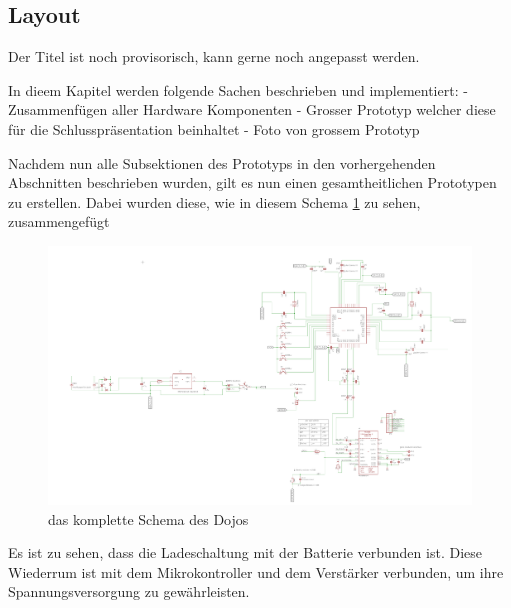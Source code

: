\subsection{Layout} \label{sec:layout}
Der Titel ist noch provisorisch, kann gerne noch angepasst werden.

In dieem Kapitel werden folgende Sachen beschrieben und implementiert:
- Zusammenfügen aller Hardware Komponenten
- Grosser Prototyp welcher diese für die Schlusspräsentation beinhaltet
- Foto von grossem Prototyp

Nachdem nun alle Subsektionen des Prototyps in den vorhergehenden Abschnitten beschrieben wurden, gilt es nun einen gesamtheitlichen Prototypen zu erstellen. Dabei wurden diese, wie in diesem Schema \ref{fig:dojo-schema} zu sehen, zusammengefügt 

\begin{figure}[H]
	\begin{center}
		\includegraphics[width=160mm]{data/dojo-schema.png}
		\caption[das komplette Schema des Dojos]{das komplette Schema des Dojos} %
		\label{fig:dojo-schema}
	\end{center}
\end{figure}

Es ist zu sehen, dass die Ladeschaltung mit der Batterie verbunden ist. Diese Wiederrum ist mit dem Mikrokontroller und dem Verstärker verbunden, um ihre Spannungsversorgung zu gewährleisten.



